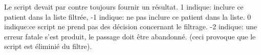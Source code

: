 \documentclass[a4paper]{scrartcl}
\begin{document}
\vspace{3mm}

Le script devait par contre toujours fournir un résultat.  1 indique: inclure ce patient dans la liste filtrée, -1 indique: ne pas inclure ce patient dans la liste.  0 indique:ce script ne prend pas des décision concernant le filtrage. -2 indique: une erreur fatale s'est produit, le passage doit être abandonné. (ceci provoque que le script est éliminié du filtre).
\end{document}
